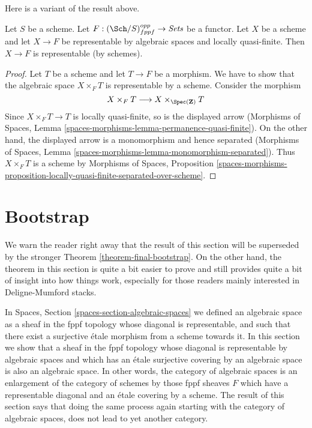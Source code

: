 \noindent
Here is a variant of the result above.

\begin{lemma}
\label{lemma-bootstrap-locally-quasi-finite}
Let $S$ be a scheme. Let $F : (\Sch/S)_{fppf}^{opp} \to \textit{Sets}$ be a
functor. Let $X$ be a scheme and let $X \to F$ be representable by algebraic
spaces and locally quasi-finite. Then $X \to F$ is representable
(by schemes).
\end{lemma}

\begin{proof}
Let $T$ be a scheme and let $T \to F$ be a morphism. We have to show that
the algebraic space $X \times_F T$ is representable by a scheme. Consider
the morphism
$$
X \times_F T  \longrightarrow X \times_{\Spec(\mathbf{Z})} T
$$
Since $X \times_F T \to T$ is locally quasi-finite, so is the displayed
arrow (Morphisms of Spaces, Lemma
\ref{spaces-morphisms-lemma-permanence-quasi-finite}).
On the other hand, the displayed arrow is a monomorphism
and hence separated (Morphisms of Spaces, Lemma
\ref{spaces-morphisms-lemma-monomorphism-separated}).
Thus $X \times_F T$ is a scheme by Morphisms of Spaces, Proposition
\ref{spaces-morphisms-proposition-locally-quasi-finite-separated-over-scheme}.
\end{proof}











\section{Bootstrap}
\label{section-bootstrap}

\noindent
We warn the reader right away that the result of this section will
be superseded by the stronger
Theorem \ref{theorem-final-bootstrap}.
On the other hand, the theorem in this section is quite a bit easier to
prove and still provides quite a bit of insight into how things work,
especially for those readers mainly interested in Deligne-Mumford
stacks.

\medskip\noindent
In
Spaces, Section \ref{spaces-section-algebraic-spaces}
we defined an algebraic space as a sheaf in the fppf topology whose
diagonal is representable, and such that there exist a surjective \'etale
morphism from a scheme towards it. In this section we show that
a sheaf in the fppf topology whose diagonal is representable by algebraic
spaces and which has an \'etale surjective covering by an algebraic space
is also an algebraic space.
In other words, the category of algebraic spaces is an enlargement of the
category of schemes by those fppf sheaves $F$ which have a representable
diagonal and an \'etale covering by a scheme. The
result of this section says that doing the same process again starting with
the category of algebraic spaces, does not lead to yet another category.

